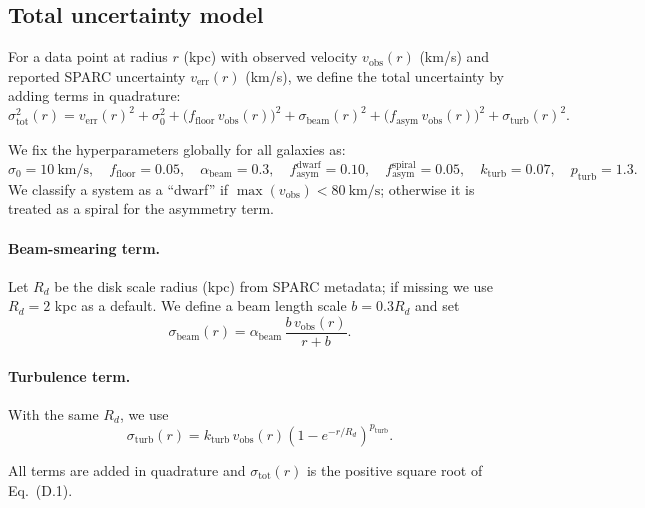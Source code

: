\documentclass[entropy,article,submit,pdftex,moreauthors]{Definitions/mdpi}
\begin{document}
\subsection{Total uncertainty model}
For a data point at radius \(r\) (kpc) with observed velocity \(v_{\mathrm{obs}}(r)\) (km/s) and reported SPARC
uncertainty \(v_{\mathrm{err}}(r)\) (km/s), we define the total uncertainty by adding terms in quadrature:
\begin{equation}
\sigma^2_{\mathrm{tot}}(r)
=
v_{\mathrm{err}}(r)^2
+ \sigma_0^2
+ \big(f_{\mathrm{floor}}\,v_{\mathrm{obs}}(r)\big)^2
+ \sigma_{\mathrm{beam}}(r)^2
+ \big(f_{\mathrm{asym}}\,v_{\mathrm{obs}}(r)\big)^2
+ \sigma_{\mathrm{turb}}(r)^2.
\tag{D.1}
\end{equation}

We fix the hyperparameters globally for all galaxies as:
\[
\sigma_0 = 10~\mathrm{km/s},\quad
f_{\mathrm{floor}} = 0.05,\quad
\alpha_{\mathrm{beam}} = 0.3,\quad
f_{\mathrm{asym}}^{\mathrm{dwarf}} = 0.10,\quad
f_{\mathrm{asym}}^{\mathrm{spiral}} = 0.05,\quad
k_{\mathrm{turb}} = 0.07,\quad
p_{\mathrm{turb}} = 1.3.
\tag{D.2}
\]
We classify a system as a ``dwarf'' if \(\max(v_{\mathrm{obs}}) < 80~\mathrm{km/s}\); otherwise it is treated as a
spiral for the asymmetry term.

\paragraph{Beam-smearing term.}
Let \(R_d\) be the disk scale radius (kpc) from SPARC metadata; if missing we use \(R_d=2\) kpc as a default.
We define a beam length scale \(b = 0.3 R_d\) and set
\begin{equation}
\sigma_{\mathrm{beam}}(r) = \alpha_{\mathrm{beam}}\,\frac{b\,v_{\mathrm{obs}}(r)}{r+b}.
\tag{D.3}
\end{equation}

\paragraph{Turbulence term.}
With the same \(R_d\), we use
\begin{equation}
\sigma_{\mathrm{turb}}(r) = k_{\mathrm{turb}}\,v_{\mathrm{obs}}(r)\left(1-e^{-r/R_d}\right)^{p_{\mathrm{turb}}}.
\tag{D.4}
\end{equation}

All terms are added in quadrature and \(\sigma_{\mathrm{tot}}(r)\) is the positive square root of Eq.~(D.1).
\end{document}
